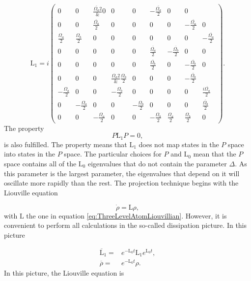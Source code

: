 \documentclass[12pt]{article}
\begin{document}
\begin{equation}\mathrm{L}_1 = i\begin{pmatrix}0 & 0 & \frac{ \overline{\Omega_a}{2}} & 0 & 0 & 0 & -\frac{  \overline{\Omega_a}}{2} & 0 & 0\\
0 & 0 & \frac{  \overline{\Omega_b}}{2} & 0 & 0 & 0 & 0 & -\frac{  \overline{\Omega_a}}{2} & 0\\
\frac{  \Omega_a}{2} & \frac{  \Omega_b}{2} & 0 & 0 & 0 & 0 & 0 & 0 & -\frac{  \overline{\Omega_a}}{2}\\
0 & 0 & 0 & 0 & 0 & \frac{  \overline{\Omega_a}}{2} & -\frac{  \overline{\Omega_b}}{2} & 0 & 0\\
0 & 0 & 0 & 0 & 0 & \frac{  \overline{\Omega_b}}{2} & 0 & -\frac{  \overline{\Omega_b}}{2} & 0\\
0 & 0 & 0 & \frac{  \Omega_a{2}} & \frac{  \Omega_b}{2} & 0 & 0 & 0 & -\frac{  \overline{\Omega_b}}{2}\\
-\frac{  \Omega_a}{2} & 0 & 0 & -\frac{  \Omega_b}{2} & 0 & 0 & 0 & 0 & \frac{ i \overline{\Omega_a}}{2}\\
0 & -\frac{  \Omega_a}{2} & 0 & 0 & -\frac{  \Omega_b}{2} & 0 & 0 & 0 & \frac{  \overline{\Omega_b}}{2}\\
0 & 0 & -\frac{  \Omega_a}{2} & 0 & 0 & -\frac{  \Omega_b}{2} & \frac{  \Omega_a}{2} & \frac{  \Omega_b}{2} & 0\end{pmatrix}.\end{equation} The property
\begin{equation}
    P\mathrm{L}_1P = 0,
\end{equation} is also fulfilled.  The  property means that $\mathrm{L}_1$ does not map states in the $P$ space into states in the $P$ space. The particular choices for $P$ and $\mathrm{L}_0$ mean that the $P$ space contains all of the $\mathrm{L}_0$ eigenvalues that do not contain the parameter $\Delta$. As this parameter is the largest parameter, the eigenvalues that depend on it will oscillate more rapidly than the rest. The projection technique begins with the Liouville equation

\begin{equation}
    \dot{\rho} = \mathrm{L}\rho,
\end{equation} with $\mathrm{L}$ the one in equation \eqref{eq:ThreeLevelAtomLiouvillian}. However, it is convenient to perform all calculations in the so-called dissipation picture. In this picture

\begin{align}
    \overline{\mathrm{L}}_1 =& e^{-\mathrm{L}_0 t}\mathrm{L}_1e^{\mathrm{L}_0 t},\\
    \overline{\rho}=&e^{-\mathrm{L}_0 t}\rho.
\end{align} In this picture, the Liouville equation is
\end{document}
